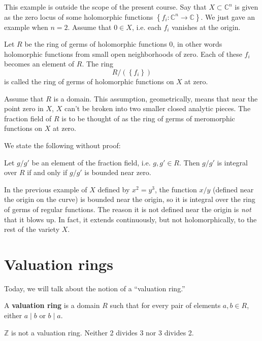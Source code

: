 \begin{example}
This example is outside the scope of the present course.  Say that $X \subset
\mathbb{C}^n$ is given as the zero locus of some holomorphic functions
$\left\{f_i: \mathbb{C}^{n} \to \mathbb{C}\right\}$.  We just gave an example
when $n=2$.
Assume that $0 \in X$, i.e. each $f_i$ vanishes at the origin.  

Let $R$ be the ring of germs of holomorphic functions $0$, in other words
holomorphic functions from small open neighborhoods of zero.  Each of these
$f_i$ becomes an  element of $R$.  The ring
\[ R/(\left\{f_i\right\} ) \]
is called the ring of germs of holomorphic functions on $X$ at zero. 

Assume that $R$ is a domain.  This assumption, geometrically, means that near
the point zero in $X$, $X$ can't be broken into two smaller closed analytic
pieces.  The fraction field of $R$ is to be thought of as the ring of
germs of meromorphic functions on $X$ at zero.

We state the following without proof:

\begin{theorem} 
Let $g/g'$ be an element of the fraction field, i.e. $g, g' \in R$. Then $g/g'$
is integral over $R$ if and only if $g/g'$ is bounded near zero. 
\end{theorem} 

In the previous example of $X$ defined by $x^2 = y^3$, the function $x/y$
(defined near the origin on the curve) is
bounded near the origin, so it is integral over the ring of germs of regular
functions. The reason it is not defined near the origin is \emph{not} that it
blows up. In fact, it extends continuously, but not holomorphically, to the
rest of the variety $X$. 
\end{example} 





\section{Valuation rings}
Today, we will talk about the notion of a ``valuation ring.''

\begin{definition} 
A \textbf{valuation ring} is a domain $R$ such that for every pair of elements
$a,b \in R$, either $a \mid b$ or $b \mid a$. 
\end{definition} 

\begin{example} 
$\mathbb{Z}$ is not a valuation ring. Neither 2 divides 3 nor 3 divides 2.
\end{example} 

